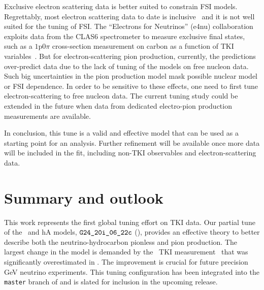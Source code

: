 Exclusive electron scattering data is better suited to constrain FSI models.
Regrettably, most electron scattering data to date is inclusive~\cite{electronsforneutrinos:2020tbf} and it is not well suited for the tuning of FSI. 
The ``Electrons for Neutrinos'' (e4nu) collaboration exploits data from the CLAS6 spectrometer to measure exclusive final states, such as a $1\textrm{p}0\pi$ cross-section measurement on carbon as a function of TKI variables~\cite{CLAS:2021neh}. But for electron-scattering pion production, 
currently, the \genie predictions over-predict data due to the lack of tuning of the \genie models on free nucleon data.
Such big uncertainties in the pion production model mask possible nuclear model or FSI dependence.
In order to be sensitive to these effects, one need to first tune electron-scattering to free nucleon data. The current tuning study could be extended in the future when data from dedicated electro-pion production measurements are available. 

In conclusion, this tune is a valid and effective model that can be used as a starting point for an analysis. 
Further refinement will be available once more data will be included in the fit, including non-TKI observables and electron-scattering data.


\section{\label{sec:summary} Summary and outlook}
This work represents the first global tuning effort on TKI data. Our partial tune of the \sfcfg\ and hA models, $\texttt{G24\_20i\_06\_22c}$ (\gC), provides an effective theory to better describe both the neutrino-hydrocarbon pionless and pion production.
The largest change in the model is demanded by the \minpiz\ TKI measurement~\cite{MINERvA:2020anu} that was significantly overestimated in \genie. 
The improvement is crucial for future precision GeV neutrino experiments.  This tuning configuration has been integrated into the \texttt{master} branch of \genie and is slated for inclusion in the upcoming release.  


